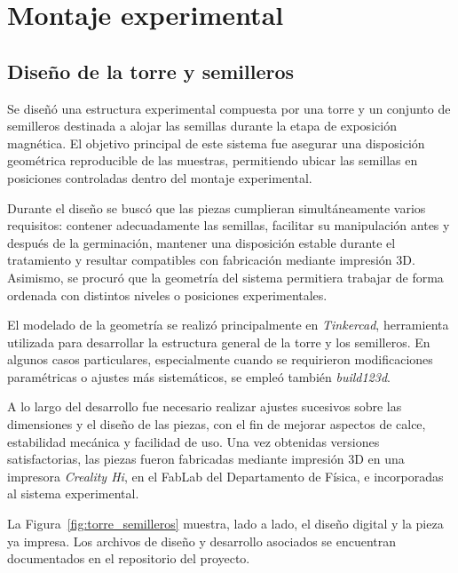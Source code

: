 \section{Montaje experimental}

\subsection{Diseño de la torre y semilleros}

Se diseñó una estructura experimental compuesta por una torre y un conjunto de semilleros destinada a alojar las semillas durante la etapa de exposición magnética. El objetivo principal de este sistema fue asegurar una disposición geométrica reproducible de las muestras, permitiendo ubicar las semillas en posiciones controladas dentro del montaje experimental.

Durante el diseño se buscó que las piezas cumplieran simultáneamente varios requisitos: contener adecuadamente las semillas, facilitar su manipulación antes y después de la germinación, mantener una disposición estable durante el tratamiento y resultar compatibles con fabricación mediante impresión 3D. Asimismo, se procuró que la geometría del sistema permitiera trabajar de forma ordenada con distintos niveles o posiciones experimentales.

El modelado de la geometría se realizó principalmente en \textit{Tinkercad}, herramienta utilizada para desarrollar la estructura general de la torre y los semilleros. En algunos casos particulares, especialmente cuando se requirieron modificaciones paramétricas o ajustes más sistemáticos, se empleó también \textit{build123d}.

A lo largo del desarrollo fue necesario realizar ajustes sucesivos sobre las dimensiones y el diseño de las piezas, con el fin de mejorar aspectos de calce, estabilidad mecánica y facilidad de uso. Una vez obtenidas versiones satisfactorias, las piezas fueron fabricadas mediante impresión 3D en una impresora \textit{Creality Hi}, en el FabLab del Departamento de Física, e incorporadas al sistema experimental.

La Figura~\ref{fig:torre_semilleros} muestra, lado a lado, el diseño digital y la pieza ya impresa. Los archivos de diseño y desarrollo asociados se encuentran documentados en el repositorio del proyecto.


